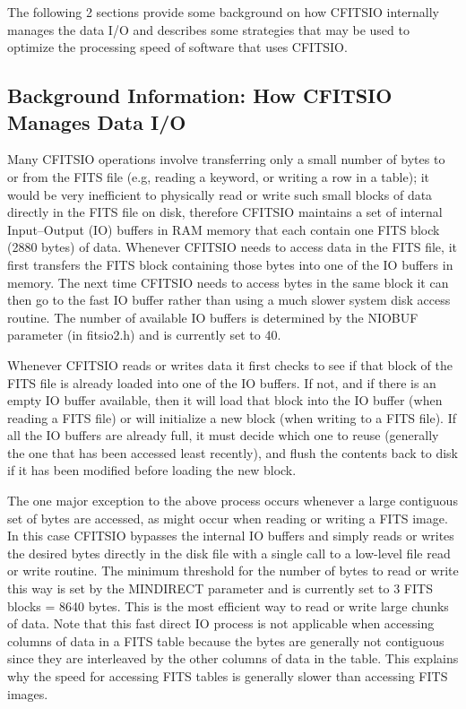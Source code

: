 \documentclass[11pt]{book}
\begin{document}
The following 2 sections provide some background on how CFITSIO
internally manages the data I/O and describes some strategies that may
be used to optimize the processing speed of software that uses
CFITSIO.


\subsection{Background Information: How CFITSIO Manages Data I/O}

Many CFITSIO operations involve transferring only a small number of
bytes to or from the FITS file (e.g, reading a keyword, or writing a
row in a table); it would be very inefficient to physically read or
write such small blocks of data directly in the FITS file on disk,
therefore CFITSIO maintains a set of internal Input--Output (IO)
buffers in RAM memory that each contain one FITS block (2880 bytes) of
data.  Whenever CFITSIO needs to access data in the FITS file, it first
transfers the FITS block containing those bytes into one of the IO
buffers in memory.  The next time CFITSIO needs to access bytes in the
same block it can then go to the fast IO buffer rather than using a
much slower system disk access routine.  The number of available IO
buffers is determined by the NIOBUF parameter (in fitsio2.h) and is
currently set to 40.

Whenever CFITSIO reads or writes data it first checks to see if that
block of the FITS file is already loaded into one of the IO buffers.
If not, and if there is an empty IO buffer available, then it will load
that block into the IO buffer (when reading a FITS file) or will
initialize a new block (when writing to a FITS file).  If all the IO
buffers are already full, it must decide which one to reuse (generally
the one that has been accessed least recently), and flush the contents
back to disk if it has been modified before loading the new block.

The one major exception to the above process occurs whenever a large
contiguous set of bytes are accessed, as might occur when reading or
writing a FITS image.  In this case CFITSIO bypasses the internal IO
buffers and simply reads or writes the desired bytes directly in the
disk file with a single call to a low-level file read or write
routine.  The minimum threshold for the number of bytes to read or
write this way is set by the MINDIRECT parameter and is currently set
to 3 FITS blocks = 8640 bytes.  This is the most efficient way to read
or write large chunks of data.  Note that this fast direct IO process is not
applicable when accessing columns of data in a FITS table because the
bytes are generally not contiguous since they are interleaved by the
other columns of data in the table.  This explains why the speed for
accessing FITS tables is generally slower than accessing
FITS images.
\end{document}

